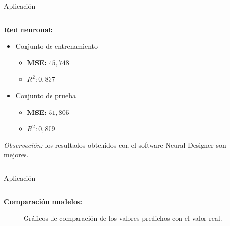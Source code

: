 \begin{frame}{Aplicación}
\begin{columns}
\begin{column}{0.9\textwidth}
\textbf{Red neuronal:}

\begin{itemize}
\item Conjunto de entrenamiento
\begin{itemize}
\item \textbf{MSE: }$45,748$
\item $R^2: 0,837$
\end{itemize}
\item Conjunto de prueba
\begin{itemize}
\item \textbf{MSE: }$51,805$
\item $R^2: 0,809$
\end{itemize}
\end{itemize}

\emph{Observación:} los resultados obtenidos con el software Neural Designer son mejores. 
\end{column}
\end{columns}
\end{frame}


\begin{frame}{Aplicación}
\begin{columns}
\begin{column}{0.9\textwidth}
\textbf{Comparación modelos:}
\begin{figure}[h]
 \centering
 \caption{Gráficos de comparación de los valores predichos con el valor real.}
  \label{fig: comparación}
\end{figure}


\end{column}
\end{columns}
\end{frame}